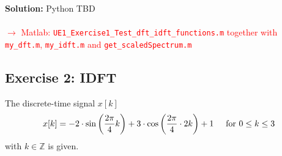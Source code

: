 \documentclass[11pt,a4paper,DIV=12]{scrartcl}
\newcommand{\red}{\textcolor{red}}
\begin{document}
\begin{Loesung}
\textbf{Solution:} Python TBD\\\\
\red{$\rightarrow$ Matlab: \texttt{UE1\_Exercise1\_Test\_dft\_idft\_functions.m}
together with \texttt{my\_dft.m}, \texttt{my\_idft.m} and
\texttt{get\_scaledSpectrum.m}}
\end{Loesung}



\subsection*{Exercise 2: IDFT}
The discrete-time signal $x[k]$
\begin{equation}
x[k]=-2\cdot\sin\left(\frac{2\pi}{4}k\right)+3\cdot\cos\left(\frac{2\pi}{4}\cdot2k\right)+1
\hspace{5mm}\text{for}\,\,0\leq k\leq3
\end{equation}
with $k\in\mathbb{Z}$ is given.
\end{document}
